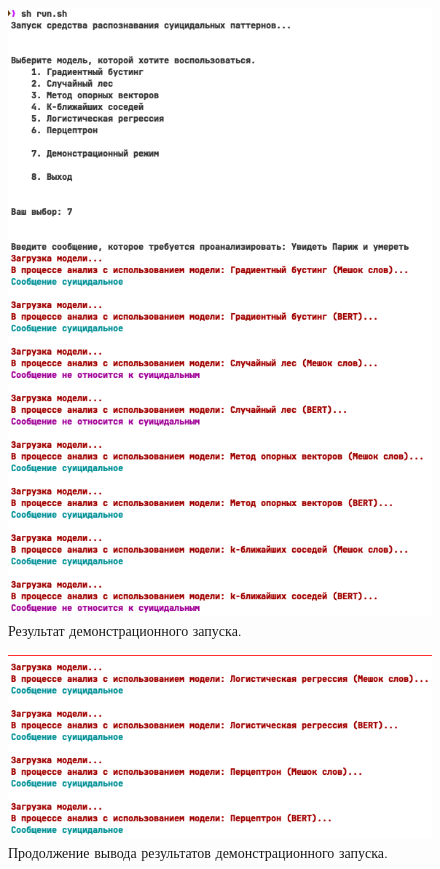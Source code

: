 \begin{figure}[H]
	\centering
	\includegraphics[width=\textwidth]{inc/utility3.png}
	\caption{ Результат демонстрационного запуска. }
	\label{img:utility3}
\end{figure}

\begin{figure}[H]
	\centering
	\includegraphics[width=\textwidth]{inc/utility4.png}
	\caption{ Продолжение вывода результатов демонстрационного запуска. }
	\label{img:utility4}
\end{figure}

